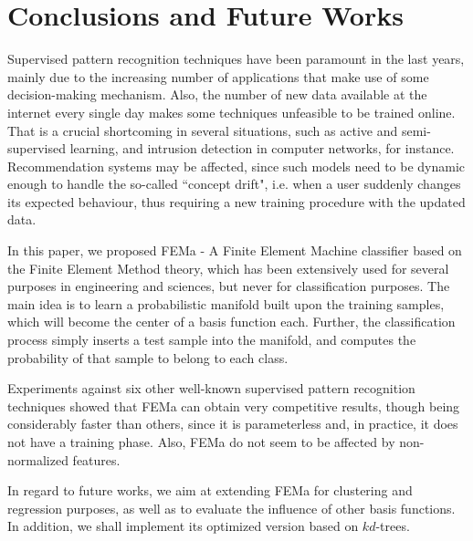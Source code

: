 \section{Conclusions and Future Works}
\label{s.conclusions}

Supervised pattern recognition techniques have been paramount in the last years, mainly due to the increasing number of applications that make use of some decision-making mechanism. Also, the number of new data available at the internet every single day makes some techniques unfeasible to be trained online. That is a crucial shortcoming in several situations, such as active and semi-supervised learning, and intrusion detection in computer networks, for instance. Recommendation systems may be affected, since such models need to be dynamic enough to handle the so-called ``concept drift", i.e. when a user suddenly changes its expected behaviour, thus requiring a new training procedure with the updated data.

In this paper, we proposed FEMa - A Finite Element Machine classifier based on the Finite Element Method theory, which has been extensively used for several purposes in engineering and sciences, but never for classification purposes. The main idea is to learn a probabilistic manifold built upon the training samples, which will become the center of a basis function each. Further, the classification process simply inserts a test sample into the manifold, and computes the probability of that sample to belong to each class.

Experiments against six other well-known supervised pattern recognition techniques showed that FEMa can obtain very competitive results, though being considerably faster than others, since it is parameterless and, in practice, it does not have a training phase. Also, FEMa do not seem to be affected by non-normalized features.

In regard to future works, we aim at extending FEMa for clustering and regression purposes, as well as to evaluate the influence of other basis functions. In addition, we shall implement its optimized version based on $kd$-trees.